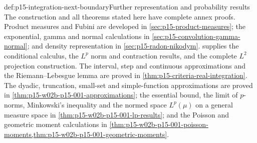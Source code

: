 \begin{proofboundary}{def:p15-integration-next-boundary}{Further representation and probability results}
The construction and all theorems stated here have complete annex proofs.
Product measures and Fubini are developed in \cref{sec:p15-product-measures};
the exponential, gamma and normal calculations in
\cref{sec:p15-convolution-gamma-normal}; and density representation in
\cref{sec:p15-radon-nikodym}.
 supplies the conditional calculus,
the \(L^p\) norm and contraction results, and the complete \(L^2\)
projection construction. The interval, step and continuous
approximations and the Riemann--Lebesgue lemma are proved in
\cref{thm:p15-criteria-real-integration}. The dyadic, truncation,
small-set and simple-function approximations are proved in
\cref{thm:p15-w02b-p15-001-approximations}; the essential bound, the
limit of \(p\)-norms, Minkowski's inequality and the normed space
\(L^p(\mu)\) on a general measure space in
\cref{thm:p15-w02b-p15-001-lp-results}; and the Poisson and geometric
moment calculations in
\cref{thm:p15-w02b-p15-001-poisson-moments,thm:p15-w02b-p15-001-geometric-moments}.
\end{proofboundary}
